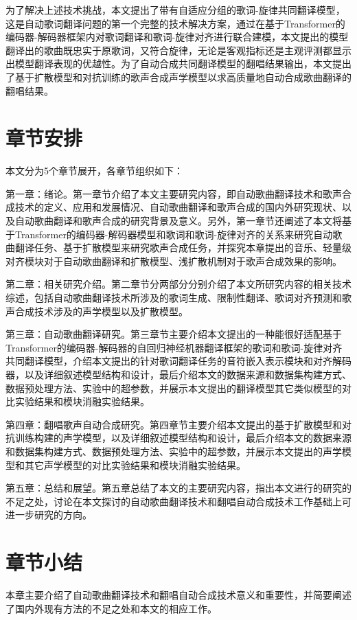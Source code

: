 为了解决上述技术挑战，本文提出了带有自适应分组的歌词-旋律共同翻译模型，这是自动歌词翻译问题的第一个完整的技术解决方案，通过在基于Transformer的编码器-解码器框架内对歌词翻译和歌词-旋律对齐进行联合建模，本文提出的模型翻译出的歌曲既忠实于原歌词，又符合旋律，无论是客观指标还是主观评测都显示出模型翻译表现的优越性。为了自动合成共同翻译模型的翻唱结果输出，本文提出了基于扩散模型和对抗训练的歌声合成声学模型以求高质量地自动合成歌曲翻译的翻唱结果。
\section{章节安排}
本文分为5个章节展开，各章节组织如下：

第一章：绪论。第一章节介绍了本文主要研究内容，即自动歌曲翻译技术和歌声合成技术的定义、应用和发展情况、自动歌曲翻译和歌声合成的国内外研究现状、以及自动歌曲翻译和歌声合成的研究背景及意义。另外，第一章节还阐述了本文将基于Transformer的编码器-解码器模型和歌词和歌词-旋律对齐的关系来研究自动歌曲翻译任务、基于扩散模型来研究歌声合成任务，并探究本章提出的音乐、轻量级对齐模块对于自动歌曲翻译和扩散模型、浅扩散机制对于歌声合成效果的影响。

第二章：相关研究介绍。第二章节分两部分分别介绍了本文所研究内容的相关技术综述，包括自动歌曲翻译技术所涉及的歌词生成、限制性翻译、歌词对齐预测和歌声合成技术涉及的声学模型以及扩散模型。

第三章：自动歌曲翻译研究。第三章节主要介绍本文提出的一种能很好适配基于Transformer的编码器-解码器的自回归神经机器翻译框架的歌词和歌词-旋律对齐共同翻译模型，介绍本文提出的针对歌词翻译任务的音符嵌入表示模块和对齐解码器，以及详细叙述模型结构和设计，最后介绍本文的数据来源和数据集构建方式、数据预处理方法、实验中的超参数，并展示本文提出的翻译模型其它类似模型的对比实验结果和模块消融实验结果。

第四章：翻唱歌声自动合成研究。第四章节主要介绍本文提出的基于扩散模型和对抗训练构建的声学模型，以及详细叙述模型结构和设计，最后介绍本文的数据来源和数据集构建方式、数据预处理方法、实验中的超参数，并展示本文提出的声学模型和其它声学模型的对比实验结果和模块消融实验结果。

第五章：总结和展望。第五章总结了本文的主要研究内容，指出本文进行的研究的不足之处，讨论在本文探讨的自动歌曲翻译技术和翻唱自动合成技术工作基础上可进一步研究的方向。
\section{章节小结}
本章主要介绍了自动歌曲翻译技术和翻唱自动合成技术意义和重要性，并简要阐述了国内外现有方法的不足之处和本文的相应工作。

